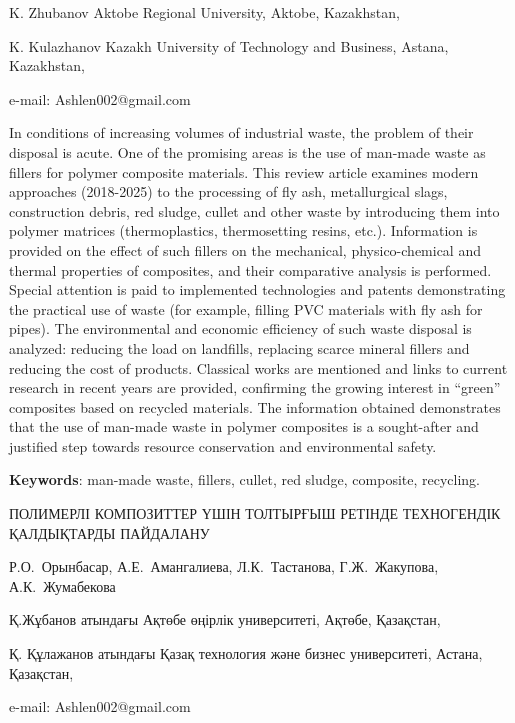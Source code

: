 \begin{affil}
K. Zhubanov Aktobe Regional University, Aktobe, Kazakhstan,

K. Kulazhanov Kazakh University of Technology and Business, Astana, Kazakhstan,

e-mail: Ashlen002@gmail.com
\end{affil}

In conditions of increasing volumes of industrial waste, the problem of
their disposal is acute. One of the promising areas is the use of
man-made waste as fillers for polymer composite materials. This review
article examines modern approaches (2018-2025) to the processing of fly
ash, metallurgical slags, construction debris, red sludge, cullet and
other waste by introducing them into polymer matrices (thermo\-plastics,
thermosetting resins, etc.). Information is provided on the effect of
such fillers on the mechanical, physico-chemical and thermal properties
of composites, and their comparative analysis is performed. Special
attention is paid to implemented technologies and patents demonstrating
the practical use of waste (for example, filling PVC materials with fly
ash for pipes). The environmental and economic efficiency of such waste
disposal is analyzed: reducing the load on landfills, replacing scarce
mineral fillers and reducing the cost of products. Classical works are
mentioned and links to current research in recent years are provided,
confirming the growing interest in ``green'' composites based on
recycled materials. The information obtained demonstrates that the use
of man-made waste in polymer composites is a sought-after and justified
step towards resource conservation and environmental safety.

{\bfseries Keywords}: man-made waste, fillers, cullet, red sludge,
composite, recycling.

\begin{header}
ПОЛИМЕРЛІ КОМПОЗИТТЕР ҮШІН ТОЛТЫРҒЫШ РЕТІНДЕ ТЕХНОГЕНДІК ҚАЛДЫҚТАРДЫ ПАЙДАЛАНУ

Р.О.~Орынбасар,
А.Е.~Амангалиева,
Л.К.~Тастанова,
Г.Ж.~Жакупова,
А.К.~Жумабекова
\end{header}

\begin{affil}
Қ.Жұбанов атындағы Ақтөбе өңірлік университеті, Ақтөбе, Қазақстан,
       
Қ. Құлажанов атындағы Қазақ технология және бизнес университеті, Астана, Қазақстан,

e-mail: Ashlen002@gmail.com
\end{affil}

